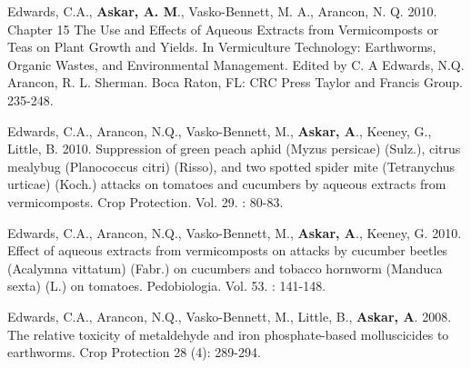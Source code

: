 \documentclass[letterpaper]{twentysecondcv} %
\begin{document}
Edwards, C.A., \textbf{Askar, A. M}., Vasko-Bennett, M. A., Arancon, N. Q. 2010. Chapter 15 The Use and Effects of Aqueous Extracts from Vermicomposts or Teas on Plant Growth and Yields. In Vermiculture Technology: Earthworms, Organic Wastes, and Environmental Management. Edited by C. A Edwards, N.Q. Arancon, R. L. Sherman. Boca Raton, FL: CRC Press Taylor and Francis Group. 235-248.

Edwards, C.A., Arancon, N.Q., Vasko-Bennett, M., \textbf{Askar, A}., Keeney, G., Little, B. 2010. Suppression of green peach aphid (Myzus persicae) (Sulz.), citrus mealybug (Planococcus citri) (Risso), and two spotted spider mite (Tetranychus urticae) (Koch.) attacks on tomatoes and cucumbers by aqueous extracts from vermicomposts.  Crop Protection. Vol. 29. : 80-83. 

Edwards, C.A., Arancon, N.Q., Vasko-Bennett, M., \textbf{Askar, A}., Keeney, G. 2010. Effect of aqueous extracts from vermicomposts on attacks by cucumber beetles (Acalymna vittatum) (Fabr.) on cucumbers and tobacco hornworm (Manduca sexta) (L.) on tomatoes.  Pedobiologia. Vol. 53. : 141-148.

Edwards, C.A., Arancon, N.Q., Vasko-Bennett, M., Little, B., \textbf{Askar, A}. 2008. The relative toxicity of metaldehyde and iron phosphate-based molluscicides to earthworms. Crop Protection 28 (4): 289-294.  
\end{document}

